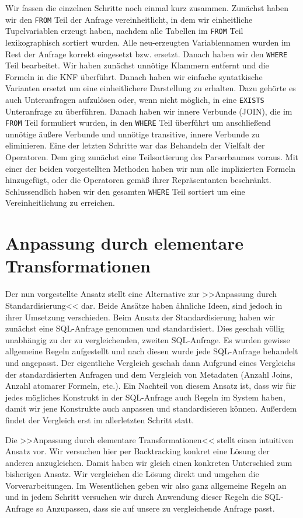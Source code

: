 Wir fassen die einzelnen Schritte noch einmal kurz zusammen. Zunächst haben wir den \verb|FROM| Teil der Anfrage vereinheitlicht, in dem wir einheitliche Tupelvariablen erzeugt haben, nachdem alle Tabellen im \verb|FROM| Teil lexikographisch sortiert wurden. Alle neu-erzeugten Variablennamen wurden im Rest der Anfrage korrekt eingesetzt bzw. ersetzt. Danach haben wir den \verb|WHERE| Teil bearbeitet. Wir haben zunächst unnötige Klammern entfernt und die Formeln in die KNF überführt. Danach haben wir einfache syntatkische Varianten ersetzt um eine einheitlichere Darstellung zu erhalten. Dazu gehörte es auch Unteranfragen aufzulösen oder, wenn nicht möglich, in eine \verb|EXISTS| Unteranfrage zu überführen. Danach haben wir innere Verbunde (JOIN), die im \verb|FROM| Teil formuliert wurden, in den \verb|WHERE| Teil überführt um anschließend unnötige äußere Verbunde und unnötige transitive, innere Verbunde  zu eliminieren. Eine der letzten Schritte war das Behandeln der Vielfalt der Operatoren. Dem ging zunächst eine Teilsortierung des Parserbaumes voraus. Mit einer der beiden vorgestellten Methoden haben wir nun alle implizierten Formeln hinzugefügt, oder die Operatoren gemäß ihrer Repräsentanten beschränkt. Schlussendlich haben wir den gesamten \verb|WHERE| Teil sortiert um eine Vereinheitlichung zu erreichen.

\section{Anpassung durch elementare Transformationen}

Der nun vorgestellte Ansatz stellt eine Alternative zur >>Anpassung durch Standardisierung<< dar. Beide Ansätze haben ähnliche Ideen, sind jedoch in ihrer Umsetzung verschieden. Beim Ansatz der Standardisierung haben wir zunächst eine SQL-Anfrage genommen und standardisiert. Dies geschah völlig unabhängig zu der zu vergleichenden, zweiten SQL-Anfrage. Es wurden gewisse allgemeine Regeln aufgestellt und nach diesen wurde jede SQL-Anfrage behandelt und angepasst. Der eigentliche Vergleich geschah dann Aufgrund eines Vergleichs der standardisierten Anfragen und dem Vergleich von Metadaten (Anzahl Joins, Anzahl atomarer Formeln, etc.). Ein Nachteil von diesem Ansatz ist, dass wir für jedes mögliches Konstrukt in der SQL-Anfrage auch Regeln im System haben, damit wir jene Konstrukte auch anpassen und standardisieren können. Außerdem findet der Vergleich erst im allerletzten Schritt statt.

Die >>Anpassung durch elementare Transformationen<< stellt einen intuitiven Ansatz vor. Wir versuchen hier per Backtracking konkret eine Lösung der anderen anzugleichen. Damit haben wir gleich einen konkreten Unterschied zum bisherigen Ansatz. Wir vergleichen die Lösung direkt und umgehen die Vorverarbeitungen. Im Wesentlichen geben wir also ganz allgemeine Regeln an und in jedem Schritt versuchen wir durch Anwendung dieser Regeln die SQL-Anfrage so Anzupassen, dass sie auf unsere zu vergleichende Anfrage passt.

